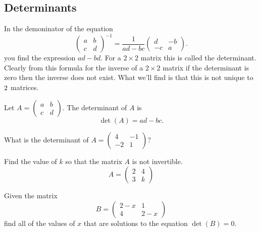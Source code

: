 \subsection{Determinants}
In the demoninator of the equation
\[ \begin{pmatrix} a & b \\ c & d \end{pmatrix}^{-1} = \frac{1}{ad-bc} \begin{pmatrix} d &
    -b \\ -c & a \end{pmatrix}. \]
you find the expression $ad-bd$.  For a $2 \times 2$ matrix this is called the
determinant.  Clearly from this formula for the inverse of a $2\times 2$ matrix if the
determinant is zero then the inverse does not exist.  What we'll find is that this is not
unique to $2\time 2$ matrices.

\begin{definition}
    Let $A = \begin{pmatrix} a & b \\ c & d \end{pmatrix}$.  The determinant of $A$ is 
    \[ \det(A) = ad - bc. \]
\end{definition}

\begin{problem}
    What is the determinant of $A = \begin{pmatrix} 4 & -1 \\ -2 & 1 \end{pmatrix}$?
\end{problem}
%
\begin{problem}
    Find the value of $k$ so that the matrix $A$ is not invertible.
    \[ A = \begin{pmatrix} 2 & 4 \\ 3 & k \end{pmatrix} \]
\end{problem}

\begin{problem}
    Given the matrix 
    \[ B = \begin{pmatrix} 2-x & 1 \\ 4 & 2-x \end{pmatrix} \]
    find all of the values of $x$ that are solutions to the equation $\det(B) = 0$.
\end{problem}


